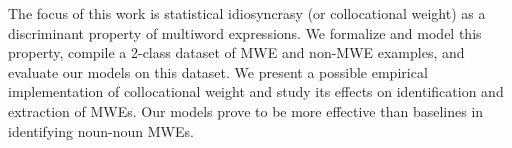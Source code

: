 The focus of this work is statistical idiosyncrasy (or collocational weight) as a discriminant property of multiword expressions. We formalize and model this property, compile a 2-class dataset of MWE and non-MWE examples, and evaluate our models on this dataset. We present a possible empirical implementation of collocational weight and study its effects on identification and extraction of MWEs. Our models prove to be more effective than baselines in identifying noun-noun MWEs.
